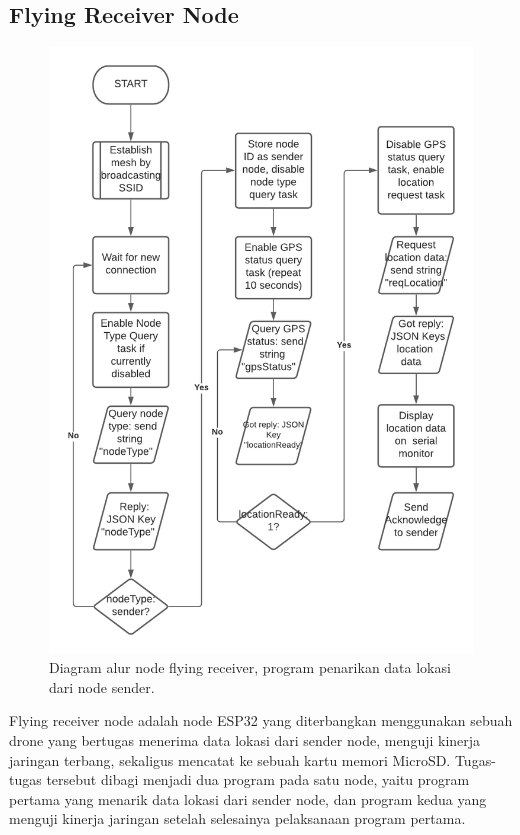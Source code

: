 \subsection{Flying Receiver Node}
\begin{figure}[H]
	\centering
	\includegraphics[scale=0.5]{./assets/FlowchartReceiver}
	\caption{Diagram alur node flying receiver, program penarikan data lokasi dari node sender.}
\end{figure}
Flying receiver node adalah node ESP32 yang diterbangkan menggunakan sebuah drone yang bertugas menerima data lokasi dari sender node, menguji kinerja jaringan terbang, sekaligus mencatat ke sebuah kartu memori MicroSD. Tugas-tugas tersebut dibagi menjadi dua program pada satu node, yaitu program pertama yang menarik data lokasi dari sender node, dan program kedua yang menguji kinerja jaringan setelah selesainya pelaksanaan program pertama.

